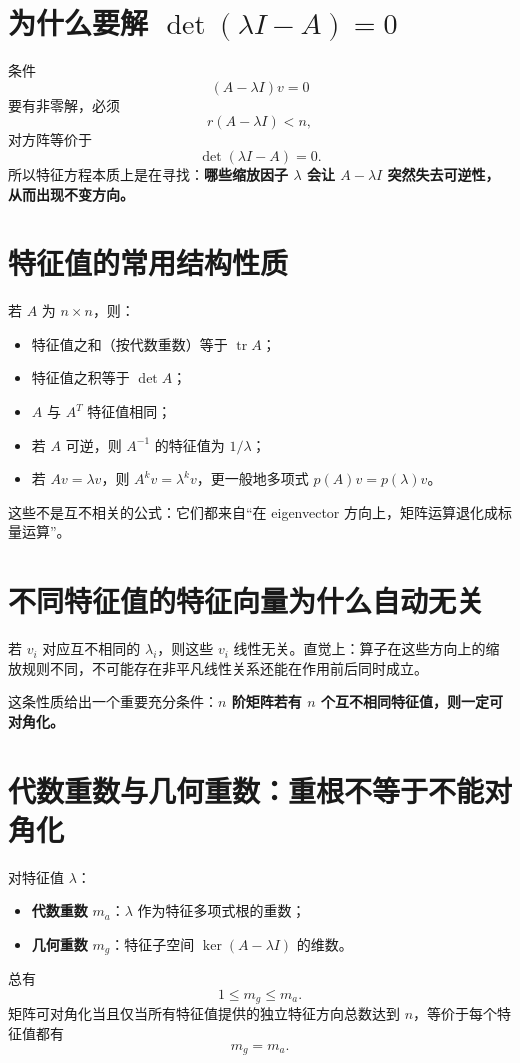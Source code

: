 \documentclass[11pt,a4paper,openany]{ctexbook}
\newcommand{\key}[1]{\textbf{\color{deep}#1}}
\begin{document}
\section{为什么要解 $\det(\lambda I-A)=0$}
条件
\[
(A-\lambda I)v=0
\]
要有非零解，必须
\[
r(A-\lambda I)<n,
\]
对方阵等价于
\[
\boxed{\det(\lambda I-A)=0}.
\]
所以特征方程本质上是在寻找：\key{哪些缩放因子 $\lambda$ 会让 $A-\lambda I$ 突然失去可逆性，从而出现不变方向。}

\section{特征值的常用结构性质}
若 $A$ 为 $n\times n$，则：
\begin{itemize}
  \item 特征值之和（按代数重数）等于 $\operatorname{tr}A$；
  \item 特征值之积等于 $\det A$；
  \item $A$ 与 $A^T$ 特征值相同；
  \item 若 $A$ 可逆，则 $A^{-1}$ 的特征值为 $1/\lambda$；
  \item 若 $Av=\lambda v$，则 $A^kv=\lambda^kv$，更一般地多项式 $p(A)v=p(\lambda)v$。
\end{itemize}
这些不是互不相关的公式：它们都来自“在 eigenvector 方向上，矩阵运算退化成标量运算”。

\section{不同特征值的特征向量为什么自动无关}
若 $v_i$ 对应互不相同的 $\lambda_i$，则这些 $v_i$ 线性无关。直觉上：算子在这些方向上的缩放规则不同，不可能存在非平凡线性关系还能在作用前后同时成立。

这条性质给出一个重要充分条件：\key{$n$ 阶矩阵若有 $n$ 个互不相同特征值，则一定可对角化。}

\section{代数重数与几何重数：重根不等于不能对角化}
对特征值 $\lambda$：
\begin{itemize}
  \item \key{代数重数} $m_a$：$\lambda$ 作为特征多项式根的重数；
  \item \key{几何重数} $m_g$：特征子空间 $\ker(A-\lambda I)$ 的维数。
\end{itemize}
总有
\[
1\le m_g\le m_a.
\]
矩阵可对角化当且仅当所有特征值提供的独立特征方向总数达到 $n$，等价于每个特征值都有
\[
m_g=m_a.
\]
\end{document}
